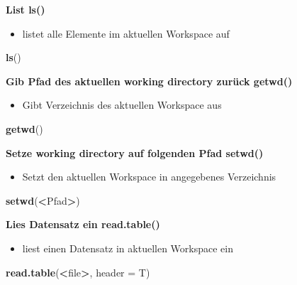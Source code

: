 \documentclass[]{book}
\newenvironment{Shaded}{\begin{snugshade}}{\end{snugshade}}
\newcommand{\KeywordTok}[1]{\textcolor[rgb]{0.13,0.29,0.53}{\textbf{#1}}}
\newcommand{\DataTypeTok}[1]{\textcolor[rgb]{0.13,0.29,0.53}{#1}}
\newcommand{\OperatorTok}[1]{\textcolor[rgb]{0.81,0.36,0.00}{\textbf{#1}}}
\newcommand{\NormalTok}[1]{#1}
\providecommand{\tightlist}{%
  \setlength{\itemsep}{0pt}\setlength{\parskip}{0pt}}
\begin{document}
\textbf{List ls()}

\begin{itemize}
\tightlist
\item
  listet alle Elemente im aktuellen Workspace auf
\end{itemize}

\begin{Shaded}
\begin{Highlighting}[]
\KeywordTok{ls}\NormalTok{()}
\end{Highlighting}
\end{Shaded}

\textbf{Gib Pfad des aktuellen working directory zurück getwd()}

\begin{itemize}
\tightlist
\item
  Gibt Verzeichnis des aktuellen Workspace aus
\end{itemize}

\begin{Shaded}
\begin{Highlighting}[]
\KeywordTok{getwd}\NormalTok{()}
\end{Highlighting}
\end{Shaded}

\textbf{Setze working directory auf folgenden Pfad setwd()}

\begin{itemize}
\tightlist
\item
  Setzt den aktuellen Workspace in angegebenes Verzeichnis
\end{itemize}

\begin{Shaded}
\begin{Highlighting}[]
\KeywordTok{setwd}\NormalTok{(}\OperatorTok{<}\NormalTok{Pfad}\OperatorTok{>}\NormalTok{)}
\end{Highlighting}
\end{Shaded}

\textbf{Lies Datensatz ein read.table()}

\begin{itemize}
\tightlist
\item
  liest einen Datensatz in aktuellen Workspace ein
\end{itemize}

\begin{Shaded}
\begin{Highlighting}[]
\KeywordTok{read.table}\NormalTok{(}\OperatorTok{<}\NormalTok{file}\OperatorTok{>}\NormalTok{, }\DataTypeTok{header =}\NormalTok{ T)}
\end{Highlighting}
\end{Shaded}
\end{document}
